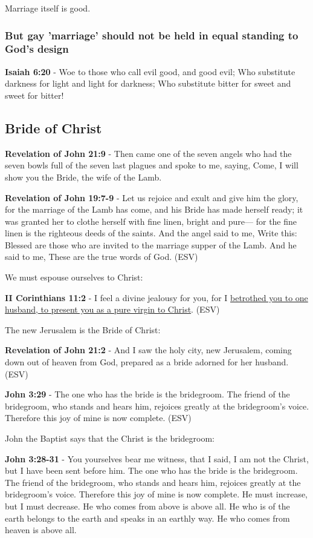 \documentclass[11pt]{article}
\begin{document}
Marriage itself is good.

\subsubsection{But gay 'marriage' should not be held in equal standing to God's design}
\label{sec:org289dbc3}

\textbf{Isaiah 6:20} - Woe to those who call evil good, and good evil; Who substitute darkness for light and light for darkness; Who substitute bitter for sweet and sweet for bitter!

\subsection{Bride of Christ}
\label{sec:org519bbd1}
\textbf{Revelation of John 21:9} - Then came one of the seven angels who had the seven bowls full of the seven last plagues and spoke to me, saying, Come, I will show you the Bride, the wife of the Lamb.

\textbf{Revelation of John 19:7-9} - Let us rejoice and exult and give him the glory, for the marriage of the Lamb has come, and his Bride has made herself ready; it was granted her to clothe herself with fine linen, bright and pure— for the fine linen is the righteous deeds of the saints. And the angel said to me, Write this: Blessed are those who are invited to the marriage supper of the Lamb. And he said to me, These are the true words of God. (ESV)

We must espouse ourselves to Christ:

\textbf{II Corinthians 11:2} - I feel a divine jealousy for you, for I \uline{betrothed you to one husband, to present you as a pure virgin to Christ}. (ESV)

The new Jerusalem is the Bride of Christ:

\textbf{Revelation of John 21:2} - And I saw the holy city, new Jerusalem, coming down out of heaven from God, prepared as a bride adorned for her husband. (ESV)

\textbf{John 3:29} - The one who has the bride is the bridegroom. The friend of the bridegroom, who stands and hears him, rejoices greatly at the bridegroom's voice. Therefore this joy of mine is now complete. (ESV)

John the Baptist says that the Christ is the bridegroom:

\textbf{John 3:28-31} - You yourselves bear me witness, that I said, I am not the Christ, but I have been sent before him. The one who has the bride is the bridegroom. The friend of the bridegroom, who stands and hears him, rejoices greatly at the bridegroom's voice. Therefore this joy of mine is now complete. He must increase, but I must decrease. He who comes from above is above all. He who is of the earth belongs to the earth and speaks in an earthly way. He who comes from heaven is above all.
\end{document}
